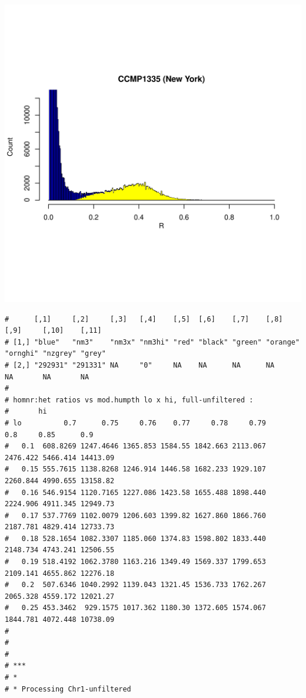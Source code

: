 \documentclass{article}\usepackage[]{graphicx}\usepackage[]{color}
\makeatletter
\def\maxwidth{ %
  \ifdim\Gin@nat@width>\linewidth
    \linewidth
  \else
    \Gin@nat@width
  \fi
}
\newenvironment{kframe}{%
 \def\at@end@of@kframe{}%
 \ifinner\ifhmode%
  \def\at@end@of@kframe{\end{minipage}}%
  \begin{minipage}{\columnwidth}%
 \fi\fi%
 \def\FrameCommand##1{\hskip\@totalleftmargin \hskip-\fboxsep
 \colorbox{shadecolor}{##1}\hskip-\fboxsep
     \hskip-\linewidth \hskip-\@totalleftmargin \hskip\columnwidth}%
 \MakeFramed {\advance\hsize-\width
   \@totalleftmargin\z@ \linewidth\hsize
   \@setminipage}}%
 {\par\unskip\endMakeFramed%
 \at@end@of@kframe}
\newenvironment{knitrout}{}{} %
\makeatother
\begin{document}
\begin{knitrout}
\includegraphics[width=\maxwidth]{FigS7-hwe-histo-figs-knitr/unnamed-chunk-10-13} 
\begin{kframe}\begin{verbatim}
#      [,1]     [,2]     [,3]   [,4]    [,5]  [,6]    [,7]    [,8]     [,9]     [,10]    [,11] 
# [1,] "blue"   "nm3"    "nm3x" "nm3hi" "red" "black" "green" "orange" "ornghi" "nzgrey" "grey"
# [2,] "292931" "291331" NA     "0"     NA    NA      NA      NA       NA       NA       NA
# 
# homnr:het ratios vs mod.humpth lo x hi, full-unfiltered :
#       hi
# lo          0.7      0.75     0.76    0.77     0.78     0.79      0.8     0.85      0.9
#   0.1  608.8269 1247.4646 1365.853 1584.55 1842.663 2113.067 2476.422 5466.414 14413.09
#   0.15 555.7615 1138.8268 1246.914 1446.58 1682.233 1929.107 2260.844 4990.655 13158.82
#   0.16 546.9154 1120.7165 1227.086 1423.58 1655.488 1898.440 2224.906 4911.345 12949.73
#   0.17 537.7769 1102.0079 1206.603 1399.82 1627.860 1866.760 2187.781 4829.414 12733.73
#   0.18 528.1654 1082.3307 1185.060 1374.83 1598.802 1833.440 2148.734 4743.241 12506.55
#   0.19 518.4192 1062.3780 1163.216 1349.49 1569.337 1799.653 2109.141 4655.862 12276.18
#   0.2  507.6346 1040.2992 1139.043 1321.45 1536.733 1762.267 2065.328 4559.172 12021.27
#   0.25 453.3462  929.1575 1017.362 1180.30 1372.605 1574.067 1844.781 4072.448 10738.09
# 
# 
# 
# ***
# *
# * Processing Chr1-unfiltered 

\end{verbatim}
\end{kframe}
\end{knitrout}
\end{document}

